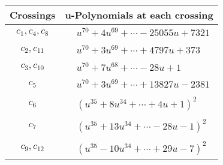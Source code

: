 \documentclass[1p]{elsarticle_modified}
\theoremstyle{definition}
\begin{document}
\begin{tabular}{m{50pt}|m{274pt}}
Crossings & \hspace{64pt}u-Polynomials at each crossing \\
\hline $$\begin{aligned}c_{1},c_{4},c_{8}\end{aligned}$$&$\begin{aligned}
&u^{70}+4 u^{69}+\cdots-25055 u+7321
\end{aligned}$\\
\hline $$\begin{aligned}c_{2},c_{11}\end{aligned}$$&$\begin{aligned}
&u^{70}+3 u^{69}+\cdots+4797 u+373
\end{aligned}$\\
\hline $$\begin{aligned}c_{3},c_{10}\end{aligned}$$&$\begin{aligned}
&u^{70}+7 u^{68}+\cdots-28 u+1
\end{aligned}$\\
\hline $$\begin{aligned}c_{5}\end{aligned}$$&$\begin{aligned}
&u^{70}+3 u^{69}+\cdots+13827 u-2381
\end{aligned}$\\
\hline $$\begin{aligned}c_{6}\end{aligned}$$&$\begin{aligned}
&(u^{35}+8 u^{34}+\cdots+4 u+1)^{2}
\end{aligned}$\\
\hline $$\begin{aligned}c_{7}\end{aligned}$$&$\begin{aligned}
&(u^{35}+13 u^{34}+\cdots-28 u-1)^{2}
\end{aligned}$\\
\hline $$\begin{aligned}c_{9},c_{12}\end{aligned}$$&$\begin{aligned}
&(u^{35}-10 u^{34}+\cdots+29 u-7)^{2}
\end{aligned}$\\
\hline
\end{tabular}\\~\\
\newpage\renewcommand{\arraystretch}{1}
\end{document}

